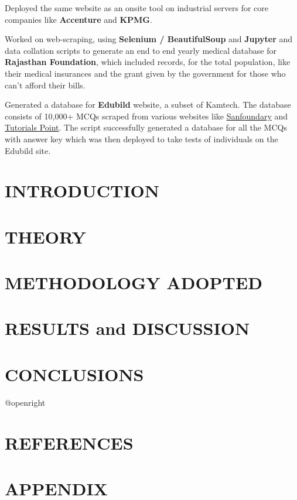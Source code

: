 \documentclass[14pt]{extarticle}
\makeatletter
\newcommand\mainmatter{
    \cleardoublepage
    \pagenumbering{arabic}
}
\newcommand\backmatter{
    \if @openright
        \cleardoublepage
    \else
        \clearpage
    \fi
}
\makeatother
\begin{document}
Deployed the same website as an onsite tool on industrial servers for core companies like \textbf{Accenture} and \textbf{KPMG}.

Worked on web-scraping, using \textbf{Selenium / BeautifulSoup} and \textbf{Jupyter} and data collation scripts to generate an end to end yearly medical database for \textbf{Rajasthan Foundation}, which included records, for the total population, like their medical insurances and the grant given by the government for those who can't afford their bills.

Generated a database for \textbf{Edubild} website, a subset of Kamtech. The database consists of 10,000+ MCQs scraped from various websites like \href{https:\\www.sanfoundary.com}{Sanfoundary} and \href{https:\\www.tutorialspoint.com}{Tutorials Point}. The script successfully generated a database for all the MCQs with answer key which was then deployed to take tests of individuals on the Edubild site.

\setlength{\parskip}{0em}

\newpage
{}
\begin{center}
    \tableofcontents
\end{center}

\mainmatter

\setlength{\parskip}{1em}

\newpage
\section{INTRODUCTION}
\lipsum

\newpage
\section{THEORY}
\lipsum

\newpage
\section{METHODOLOGY ADOPTED}
\lipsum

\newpage
\section{RESULTS and DISCUSSION}
\lipsum

\newpage
\section{CONCLUSIONS}
\lipsum

\backmatter

\newpage
{}
\section*{REFERENCES}
\lipsum[10]

\newpage
{}
\section*{APPENDIX}
\lipsum[10]
\end{document}
